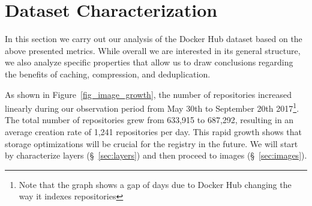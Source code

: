 \section{Dataset Characterization}
\label{sec:char}

In this section we carry out our analysis of the Docker Hub dataset based on
the above presented metrics. While overall we are interested in its general structure,
we also analyze specific properties that allow us to draw conclusions regarding the
benefits of caching, compression, and deduplication.

As shown in Figure~\ref{fig_image_growth}, the number of repositories increased
linearly during our observation period from May 30th to September 20th
2017\footnote{Note that the graph shows a gap of \gap days due to Docker Hub
changing the way it indexes repositories}. The total number of repositories
grew from 633,915 to 687,292, resulting in an average creation rate of 1,241
repositories per day. This rapid growth shows that storage optimizations will
be crucial for the registry in the future.
%
We will start by characterize layers (\S~\ref{sec:layers}) and then proceed to
images (\S~\ref{sec:images}).
%



